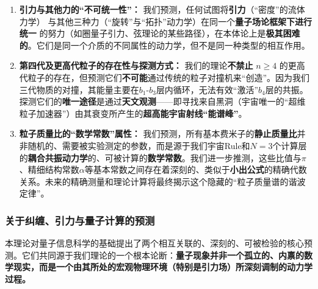 \documentclass[11pt, a4paper]{article}
\begin{document}
\begin{enumerate}
    \item \textbf{引力与其他力的“不可统一性”：}
    我们预测，任何试图将\textbf{引力}（“密度”的流体力学） \cite{Newton1687}与其他三种力（“旋转”与“拓扑”动力学）在同一个\textbf{量子场论框架下进行统一} \cite{deBroglie1930}的努力（如圈量子引力、弦理论的某些路径），在本体论上是\textbf{极其困难的}。它们是同一个介质的不同属性的动力学，但不是同一种类型的相互作用。

    \item \textbf{第四代及更高代粒子的存在性与探测方式：}
    我们的理论\textbf{不禁止} $n \ge 4$ 的更高代粒子的存在，但预测它们\textbf{不可能}通过传统的粒子对撞机来“创造”。因为我们三代物质的对撞，其能量主要在$b_1$-$b_3$层内循环，无法有效“激活”$b_4$层的共振。探测它们的\textbf{唯一途径}是通过\textbf{天文观测}——即寻找来自黑洞（宇宙唯一的“超维粒子加速器”）由其衰变所产生的\textbf{超高能宇宙射线“能谱峰”}。

    \item \textbf{粒子质量比的“数学常数”属性：}
    我们预测，所有基本费米子的\textbf{静止质量比}并非随机的、需要被实验测定的参数，而是源于我们宇宙Rule和$N=3$个计算层的\textbf{耦合共振动力学}的、可被计算的\textbf{数学常数}。我们进一步推测，这些比值与$\pi$、精细结构常数$\alpha$等基本常数之间存在着深刻的、类似于\textbf{小出公式}的精确代数关系。未来的精确测量和理论计算将最终揭示这个隐藏的“粒子质量谱的谐波定律”。
\end{enumerate}

\subsubsection{关于纠缠、引力与量子计算的预测}

本理论对量子信息科学的基础提出了两个相互关联的、深刻的、可被检验的核心预测。它们共同源于我们理论的一个根本论断：\textbf{量子现象并非一个孤立的、内禀的数学现实，而是一个由其所处的宏观物理环境（特别是引力场）所深刻调制的动力学过程。}
\end{document}
